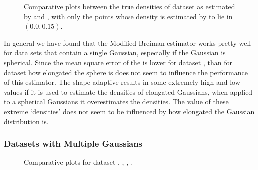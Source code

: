\begin{figure}
\begin{subfigure}{0.6\columnwidth}
				\caption{\sambe}
				\label{fig:results:baakman5:noOUtliers:sambe}
			\end{subfigure}	
			\caption{Comparative plots between the true densities of dataset \baakmanFive as estimated by  \mbe and  \sambe, with only the points whose density is estimated by \sambe to lie in $\left(\num{0.0}, \num{0.15} \right)$.}
			\label{fig:results:baakman5:noOutliers}
		\end{figure}

		In general we have found that the Modified Breiman estimator works pretty well for data sets that contain a single Gaussian, especially if the Gaussian is spherical. Since the mean square error of the \mbe is lower for dataset \baakmanFive, than for dataset \baakmanFour how elongated the sphere is does not seem to influence the performance of this estimator. 
		The shape adaptive \mbe results in some extremely high and low values if it is used to estimate the densities of elongated Gaussians, when applied to a spherical Gaussians it overestimates the densities. The value of these extreme `densities' does not seem to be influenced by how elongated the Gaussian distribution is. 

\subsubsection{Datasets with Multiple Gaussians}
	\label{s:results:plots:multipleGaussians}

	\begin{figure}
		\centering
		
		\caption{Comparative plots for dataset \ferdosiTwo, \ferdosiThree, \baakmanTwo, \baakmanThree.}
		\label{fig:4:resuts:multiSphere}
	\end{figure}


